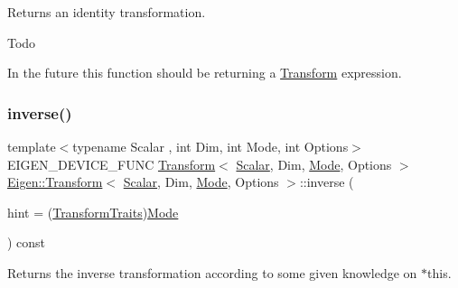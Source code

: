 Returns an identity transformation. 

\begin{DoxyRefDesc}{Todo}
\item[\mbox{\hyperlink{todo__todo000001}{Todo}}]In the future this function should be returning a \mbox{\hyperlink{class_eigen_1_1_transform}{Transform}} expression. \end{DoxyRefDesc}
\mbox{\label{class_eigen_1_1_transform_a20ca137b84f18b9c41a0fef9c222e0da}} 
\subsubsection{\texorpdfstring{inverse()}{inverse()}}
{\footnotesize\ttfamily template$<$typename Scalar , int Dim, int Mode, int Options$>$ \\
E\+I\+G\+E\+N\+\_\+\+D\+E\+V\+I\+C\+E\+\_\+\+F\+U\+NC \mbox{\hyperlink{class_eigen_1_1_transform}{Transform}}$<$ \mbox{\hyperlink{class_eigen_1_1_transform_a4e69ced9d651745b8ed4eda46f41795d}{Scalar}}, Dim, \mbox{\hyperlink{struct_mode}{Mode}}, Options $>$ \mbox{\hyperlink{class_eigen_1_1_transform}{Eigen\+::\+Transform}}$<$ \mbox{\hyperlink{class_eigen_1_1_transform_a4e69ced9d651745b8ed4eda46f41795d}{Scalar}}, Dim, \mbox{\hyperlink{struct_mode}{Mode}}, Options $>$\+::inverse (\begin{DoxyParamCaption}\item[{\mbox{\hyperlink{group__enums_gaee59a86102f150923b0cac6d4ff05107}{Transform\+Traits}}}]{hint = {\ttfamily (\mbox{\hyperlink{group__enums_gaee59a86102f150923b0cac6d4ff05107}{Transform\+Traits}})\mbox{\hyperlink{struct_mode}{Mode}}} }\end{DoxyParamCaption}) const\hspace{0.3cm}{\ttfamily [inline]}}

\begin{DoxyReturn}{Returns}
the inverse transformation according to some given knowledge on {\ttfamily $\ast$this}.
\end{DoxyReturn}

